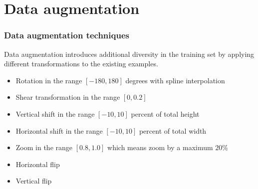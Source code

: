 \documentclass{beamer}
\begin{document}
\section{Data augmentation}
\begin{frame}
\frametitle{Data augmentation techniques}

Data augmentation introduces additional diversity in the training set by applying different transformations to the existing examples.
\vskip 0.2in
\begin{itemize}
\item Rotation in the range $[-180, 180]$ degrees with spline interpolation
\item Shear transformation in the range $[0, 0.2]$
\item Vertical shift in the range $[-10, 10]$ percent of total height
\item Horizontal shift in the range $[-10, 10]$ percent of total width
\item Zoom in the range $[0.8, 1.0]$ which means zoom by a maximum $20\%$
\item Horizontal flip
\item Vertical flip
\end{itemize}

\end{frame}
\end{document}
